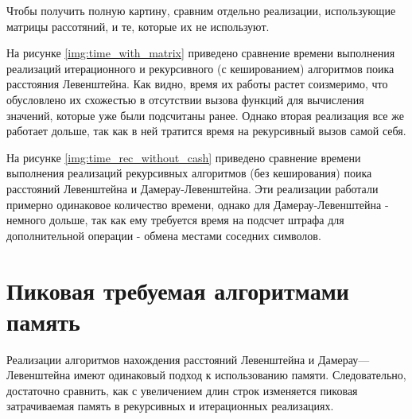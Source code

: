 
 Чтобы получить полную картину, сравним отдельно реализации, использующие матрицы рассотяний, и те, которые их не используют.
 
 На рисунке \ref{img:time_with_matrix} приведено сравнение времени выполнения реализаций итерационного и рекурсивного (с кешированием) алгоритмов поика расстояния Левенштейна. Как видно, время их работы растет соизмеримо, что обусловлено их схожестью в отсутствии вызова функций для вычисления значений, которые уже были подсчитаны ранее. Однако вторая реализация все же работает дольше, так как в ней тратится время на рекурсивный вызов самой себя. 
 
 
 На рисунке \ref{img:time_rec_without_cash} приведено сравнение времени выполнения реализаций рекурсивных алгоритмов (без кеширования) поика расстояний Левенштейна и Дамерау-Левенштейна. Эти реализации работали примерно одинаковое количество времени, однако для Дамерау-Левенштейна - немного дольше, так как ему требуется время на подсчет штрафа для дополнительной операции - обмена местами соседних символов.
 
 
 
 




\section{Пиковая требуемая алгоритмами память}

Реализации алгоритмов нахождения расстояний Левенштейна и Дамерау—Левенштейна имеют одинаковый подход к использованию памяти. Следовательно, достаточно сравнить, как с увеличением длин строк изменяется пиковая затрачиваемая память в рекурсивных и итерационных реализациях. 

